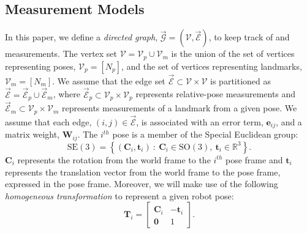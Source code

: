 \documentclass[lettersize,journal]{IEEEtran}
\newcommand{\EdgeSet}{\vec{\bm{\mathcal{E}}}}
\newcommand{\VertSetP}{\bm{\mathcal{V}}_p}
\newcommand{\VertSetM}{\bm{\mathcal{V}}_m}
\newcommand{\VertSet}{\bm{\mathcal{V}}}
\newcommand{\Graph}{\vec{\bm{\mathcal{G}}}}
\newcommand{\rev}[1]{\color{red}{#1}\color{black}}
\begin{document}
\subsection{Measurement Models}

In this paper, we define a \textit{directed graph}, $ \Graph = \left(\VertSet, \EdgeSet\right)$, to keep track of \rev{poses } and measurements. The vertex set $ \VertSet = \VertSetP \cup \VertSetM $ is the union of the set of vertices representing poses, $ \VertSetP =\left[N_p\right]$, and the set of vertices representing landmarks, $ \VertSetM = \left[N_m\right]$. We assume that the edge set $\EdgeSet \subset \VertSet \times \VertSet$ is partitioned as $\EdgeSet= \EdgeSet_p \cup \EdgeSet_m$, where $\EdgeSet_p\subset \VertSet_p\times \VertSet_p$ represents relative-pose measurements and $\EdgeSet_m\subset \VertSet_p\times \VertSet_m$ represents measurements of a landmark from a given pose. We assume that each edge, $(i,j)\in \EdgeSet$, is associated with an error term, $\bm{e}_{ij}$, and a matrix weight, $\bm{W}_{ij}$. The $i^{th}$ pose is a member of the Special Euclidean group:
\begin{equation}\label{eqn:pose_var}
	\mbox{SE}(3) = \left\{(\bm{C}_i, \bm{t}_i)~:~\bm{C}_i\in \mbox{SO}(3),~ \bm{t}_i\in \mathbb{R}^3\right\}.
\end{equation}
$\bm{C}_i$ represents the rotation from the world frame to the $i^{th}$ pose frame and $\bm{t}_i$ represents the translation vector from the world frame to the pose frame, expressed in the pose frame. Moreover, we will make use of the following \textit{homogeneous transformation} to represent a given robot pose:
\begin{equation}
	\bm{T}_i = \begin{bmatrix}
		\bm{C}_i & -\bm{t}_i \\ \bm{0} & 1
	\end{bmatrix}.
\end{equation}
\end{document}

